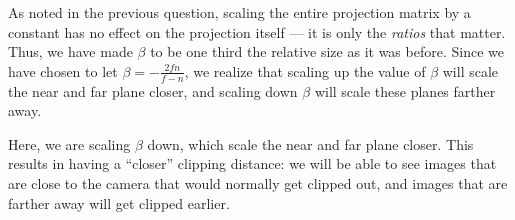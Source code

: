 \documentclass[11pt]{tingpset}
\begin{document}

    As noted in the previous question, scaling the entire projection matrix by a constant has no effect on the projection itself --- it is only the \emph{ratios} that matter. Thus, we have made $\beta$ to be one third the relative size as it was before. Since we have chosen to let $\beta = -\frac{2fn}{f-n}$, we realize that scaling up the value of $\beta$ will scale the near and far plane closer, and scaling down $\beta$ will scale these planes farther away.

    Here, we are scaling $\beta$ down, which scale the near and far plane closer. This results in having a ``closer'' clipping distance: we will be able to see images that are close to the camera that would normally get clipped out, and images that are farther away will get clipped earlier.



\end{document}
